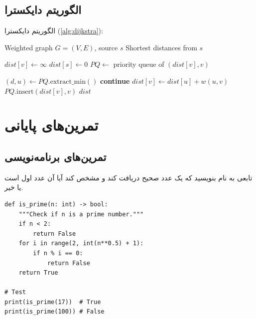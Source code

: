 \documentclass{matinbook}
\begin{document}
\section{الگوریتم دایکسترا}
\label{sec:graphs-dijkstra}

الگوریتم دایکسترا (\cref{alg:dijkstra}):

\begin{latin}
\begin{algorithm}
\caption{الگوریتم دایکسترا}
\label{alg:dijkstra}
\begin{algorithmic}[1]
    \Require Weighted graph $G = (V, E)$, source $s$
    \Ensure Shortest distances from $s$

        \State $dist[v] \gets \infty$
    \EndFor
    \State $dist[s] \gets 0$
    \State $PQ \gets$ priority queue of $(dist[v], v)$

        \State $(d, u) \gets PQ.\text{extract\_min}()$
         \textbf{continue} \EndIf
                \State $dist[v] \gets dist[u] + w(u,v)$
                \State $PQ.\text{insert}(dist[v], v)$
            \EndIf
        \EndFor
    \EndWhile
    \State \Return $dist$
\end{algorithmic}
\end{algorithm}
\end{latin}

\chapter{تمرین‌های پایانی}
\label{chap:exercises}

\section{تمرین‌های برنامه‌نویسی}
\label{sec:exercises-programming}

\begin{exercise}
    تابعی به نام  بنویسید که یک
    عدد صحیح دریافت کند و مشخص کند آیا آن عدد اول
    است یا خیر.
    \label{exc:is-prime}
\end{exercise}

\begin{solution}
    \begin{latin}
\begin{verbatim}
def is_prime(n: int) -> bool:
    """Check if n is a prime number."""
    if n < 2:
        return False
    for i in range(2, int(n**0.5) + 1):
        if n % i == 0:
            return False
    return True

# Test
print(is_prime(17))  # True
print(is_prime(100)) # False
\end{verbatim}
    \end{latin}
\end{solution}
\end{document}
